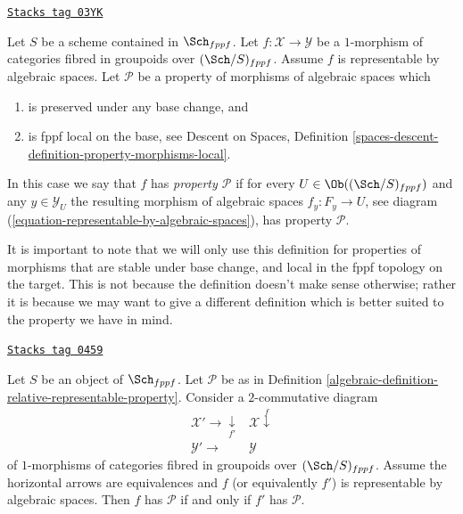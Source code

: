 \begin{definition}
\label{algebraic-definition-relative-representable-property}
\href{https://stacks.math.columbia.edu/tag/03YK}{\texttt{Stacks tag 03YK}}

Let $S$ be a scheme contained in $\Sch_{fppf}$.
Let $f : \mathcal{X} \to \mathcal{Y}$ be a $1$-morphism
of categories fibred in groupoids over $(\Sch/S)_{fppf}$.
Assume $f$ is representable by algebraic spaces.
Let $\mathcal{P}$ be a property of morphisms of algebraic spaces which
\begin{enumerate}
\item is preserved under any base change, and
\item is fppf local on the base, see
Descent on Spaces,
Definition \ref{spaces-descent-definition-property-morphisms-local}.
\end{enumerate}
In this case we say that $f$ has {\it property $\mathcal{P}$} if for every
$U \in \Ob((\Sch/S)_{fppf})$ and
any $y \in \mathcal{Y}_U$ the resulting morphism of algebraic spaces
$f_y : F_y \to U$, see
diagram (\ref{equation-representable-by-algebraic-spaces}),
has property $\mathcal{P}$.
\end{definition}

It is important to note that we will only use this definition for
properties of morphisms that are stable under base change, and
local in the fppf topology on the target. This is
not because the definition doesn't make sense otherwise; rather it
is because we may want to give a different definition which is
better suited to the property we have in mind.

\begin{lemma}
\label{algebraic-lemma-property-morphism-equivalent}
\href{https://stacks.math.columbia.edu/tag/0459}{\texttt{Stacks tag 0459}}

Let $S$ be an object of $\Sch_{fppf}$.
Let $\mathcal{P}$ be as in
Definition \ref{algebraic-definition-relative-representable-property}.
Consider a $2$-commutative diagram
$$
\begin{array}{cc}\mathcal{X}' \longrightarrow\underset{f'}{\downarrow} & \mathcal{X} \overset{f}{\downarrow} \\ \mathcal{Y}' \longrightarrow & \mathcal{Y}\end{array}
$$
of $1$-morphisms of categories fibred in groupoids over
$(\Sch/S)_{fppf}$.
Assume the horizontal arrows are equivalences and $f$ (or equivalently $f'$)
is representable by algebraic spaces.
Then $f$ has $\mathcal{P}$ if and only if $f'$ has $\mathcal{P}$.
\end{lemma}

